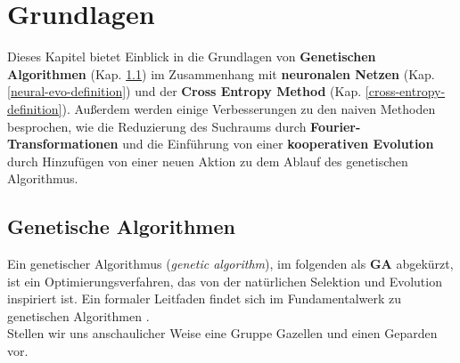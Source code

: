
\chapter{Grundlagen} \label{basics}

Dieses Kapitel bietet Einblick in die Grundlagen von \textbf{Genetischen Algorithmen} (Kap. \ref{ga-my-definition}) im Zusammenhang mit \textbf{neuronalen Netzen} (Kap. \ref{neural-evo-definition}) und der \textbf{Cross Entropy Method} (Kap. \ref{cross-entropy-definition}). Außerdem werden einige Verbesserungen zu den naiven Methoden besprochen, wie die Reduzierung des Suchraums durch \textbf{Fourier-Transformationen} und die Einführung von einer \textbf{kooperativen Evolution} durch Hinzufügen von einer neuen Aktion zu dem Ablauf des genetischen Algorithmus.

    \section{Genetische Algorithmen} \label{ga-my-definition}


        Ein genetischer Algorithmus (\textit{genetic algorithm}), im folgenden als \textbf{GA} abgekürzt, ist ein Optimierungsverfahren, das von der natürlichen Selektion und Evolution inspiriert ist. Ein formaler Leitfaden findet sich im Fundamentalwerk zu genetischen Algorithmen \cite{ga}.\\[2mm]
        Stellen wir uns anschaulicher Weise eine Gruppe Gazellen und einen Geparden vor.\\

